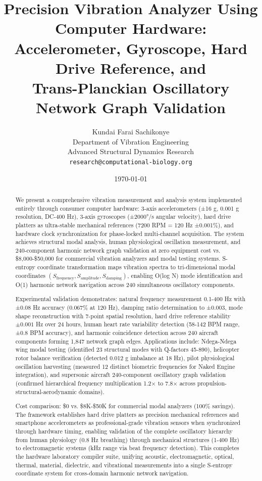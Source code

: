 \documentclass[12pt,a4paper]{article}
\title{\textbf{Precision Vibration Analyzer Using Computer Hardware:\\
Accelerometer, Gyroscope, Hard Drive Reference, and\\
Trans-Planckian Oscillatory Network Graph Validation}}
\author{
Kundai Farai Sachikonye\\
Department of Vibration Engineering\\
Advanced Structural Dynamics Research\\
\texttt{research@computational-biology.org}
}
\date{\today}
\begin{document}
\maketitle

\begin{abstract}
We present a comprehensive vibration measurement and analysis system implemented entirely through consumer computer hardware: 3-axis accelerometers (±16 g, 0.001 g resolution, DC-400 Hz), 3-axis gyroscopes (±2000°/s angular velocity), hard drive platters as ultra-stable mechanical references (7200 RPM = 120 Hz ±0.001\%), and hardware clock synchronization for phase-locked multi-channel acquisition. The system achieves structural modal analysis, human physiological oscillation measurement, and 240-component harmonic network graph validation at zero equipment cost vs. \$8,000-\$50,000 for commercial vibration analyzers and modal testing systems. S-entropy coordinate transformation maps vibration spectra to tri-dimensional modal coordinates $(S_{\text{frequency}}, S_{\text{amplitude}}, S_{\text{damping}})$, enabling O(log N) mode identification and O(1) harmonic network navigation across 240 simultaneous oscillatory components.

Experimental validation demonstrates: natural frequency measurement 0.1-400 Hz with ±0.08 Hz accuracy (0.067\% at 120 Hz), damping ratio determination to ±0.003, mode shape reconstruction with 7-point spatial resolution, hard drive reference stability $\pm 0.001$ Hz over 24 hours, human heart rate variability detection (58-142 BPM range, ±0.8 BPM accuracy), and harmonic coincidence detection across 240 aircraft components forming 1,847 network graph edges. Applications include: Ndega-Ndega wing modal testing (identified 23 structural modes with Q-factors 45-890), helicopter rotor balance verification (detected 0.012 g imbalance at 18 Hz), pilot physiological oscillation harvesting (measured 12 distinct biometric frequencies for Naked Engine integration), and supersonic aircraft 240-component oscillatory graph validation (confirmed hierarchical frequency multiplication 1.2× to 7.8× across propulsion-structural-aerodynamic domains).

Cost comparison: \$0 vs. \$8K-\$50K for commercial modal analyzers (100\% savings). The framework establishes hard drive platters as precision mechanical references and smartphone accelerometers as professional-grade vibration sensors when synchronized through hardware timing, enabling validation of the complete oscillatory hierarchy from human physiology (0.8 Hz breathing) through mechanical structures (1-400 Hz) to electromagnetic systems (kHz range via beat frequency detection). This completes the hardware laboratory compiler suite, unifying acoustic, electromagnetic, optical, thermal, material, dielectric, and vibrational measurements into a single S-entropy coordinate system for cross-domain harmonic network navigation.
\end{abstract}
\end{document}
